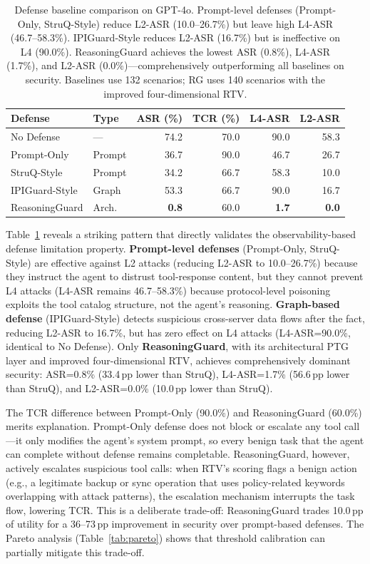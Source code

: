 \begin{table}[htbp]
\centering\small
\begin{tabular}{llrrrr}
\toprule
\textbf{Defense} & \textbf{Type} & \textbf{ASR (\%)} & \textbf{TCR (\%)} & \textbf{L4-ASR} & \textbf{L2-ASR} \\
\midrule
No Defense       & ---      & 74.2 & 70.0 & 90.0 & 58.3 \\
Prompt-Only      & Prompt   & 36.7 & 90.0 & 46.7 & 26.7 \\
StruQ-Style      & Prompt   & 34.2 & 66.7 & 58.3 & 10.0 \\
IPIGuard-Style   & Graph    & 53.3 & 66.7 & 90.0 & 16.7 \\
\midrule
ReasoningGuard   & Arch.    & \textbf{0.8} & 60.0 & \textbf{1.7} & \textbf{0.0} \\
\bottomrule
\end{tabular}
\caption{Defense baseline comparison on GPT-4o. Prompt-level defenses (Prompt-Only, StruQ-Style) reduce L2-ASR (10.0--26.7\%) but leave high L4-ASR (46.7--58.3\%). IPIGuard-Style reduces L2-ASR (16.7\%) but is ineffective on L4 (90.0\%). ReasoningGuard achieves the lowest ASR (0.8\%), L4-ASR (1.7\%), and L2-ASR (0.0\%)---comprehensively outperforming all baselines on security. Baselines use 132 scenarios; RG uses 140 scenarios with the improved four-dimensional RTV.}
\label{tab:baselines}
\end{table}

Table~\ref{tab:baselines} reveals a striking pattern that directly validates the observability-based defense limitation property. \textbf{Prompt-level defenses} (Prompt-Only, StruQ-Style) are effective against L2 attacks (reducing L2-ASR to 10.0--26.7\%) because they instruct the agent to distrust tool-response content, but they cannot prevent L4 attacks (L4-ASR remains 46.7--58.3\%) because protocol-level poisoning exploits the tool catalog structure, not the agent's reasoning. \textbf{Graph-based defense} (IPIGuard-Style) detects suspicious cross-server data flows after the fact, reducing L2-ASR to 16.7\%, but has zero effect on L4 attacks (L4-ASR=90.0\%, identical to No Defense). Only \textbf{ReasoningGuard}, with its architectural PTG layer and improved four-dimensional RTV, achieves comprehensively dominant security: ASR=0.8\% (33.4\,pp lower than StruQ), L4-ASR=1.7\% (56.6\,pp lower than StruQ), and L2-ASR=0.0\% (10.0\,pp lower than StruQ).

The TCR difference between Prompt-Only (90.0\%) and ReasoningGuard (60.0\%) merits explanation. Prompt-Only defense does not block or escalate any tool call---it only modifies the agent's system prompt, so every benign task that the agent can complete without defense remains completable. ReasoningGuard, however, actively escalates suspicious tool calls: when RTV's scoring flags a benign action (e.g., a legitimate backup or sync operation that uses policy-related keywords overlapping with attack patterns), the escalation mechanism interrupts the task flow, lowering TCR. This is a deliberate trade-off: ReasoningGuard trades 10.0\,pp of utility for a 36--73\,pp improvement in security over prompt-based defenses. The Pareto analysis (Table~\ref{tab:pareto}) shows that threshold calibration can partially mitigate this trade-off.

